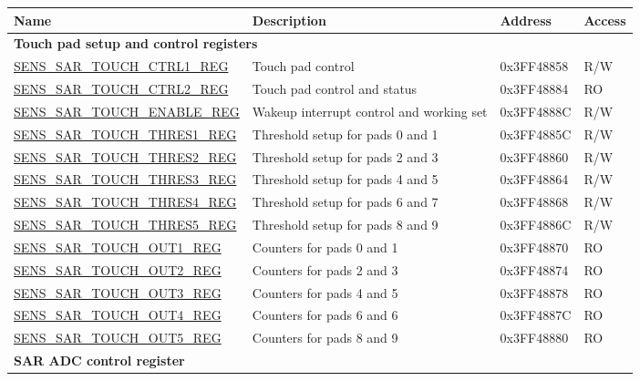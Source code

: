 \begin{longtable}{ | p{5.5cm} | p{7cm} | p{2cm} | p{1cm} | }
\hline\rowcolor{lightgray}
Name & Description &  Address & Access \\ \hline
\multicolumn{4}{|l|}{\textbf{Touch pad setup and control registers}} \\ \hline
\hyperref[regdesc:SENSSARTOUCHCTRL1REG]{SENS\_SAR\_TOUCH\_CTRL1\_REG} & Touch pad control & 0x3FF48858 & R/W \\ \hline
\hyperref[regdesc:SENSSARTOUCHCTRL2REG]{SENS\_SAR\_TOUCH\_CTRL2\_REG} & Touch pad control and status & 0x3FF48884 & RO \\ \hline
\hyperref[regdesc:SENSSARTOUCHENABLEREG]{SENS\_SAR\_TOUCH\_ENABLE\_REG} & Wakeup interrupt control and working set & 0x3FF4888C & R/W \\ \hline
\hyperref[regdesc:SENSSARTOUCHTHRES1REG]{SENS\_SAR\_TOUCH\_THRES1\_REG} & Threshold setup for pads 0 and 1 & 0x3FF4885C & R/W \\ \hline
\hyperref[regdesc:SENSSARTOUCHTHRES2REG]{SENS\_SAR\_TOUCH\_THRES2\_REG} & Threshold setup for pads 2 and 3 & 0x3FF48860 & R/W \\ \hline
\hyperref[regdesc:SENSSARTOUCHTHRES3REG]{SENS\_SAR\_TOUCH\_THRES3\_REG} & Threshold setup for pads 4 and 5 & 0x3FF48864 & R/W \\ \hline
\hyperref[regdesc:SENSSARTOUCHTHRES4REG]{SENS\_SAR\_TOUCH\_THRES4\_REG} & Threshold setup for pads 6 and 7 & 0x3FF48868 & R/W \\ \hline
\hyperref[regdesc:SENSSARTOUCHTHRES5REG]{SENS\_SAR\_TOUCH\_THRES5\_REG} & Threshold setup for pads 8 and 9 & 0x3FF4886C & R/W \\ \hline
\hyperref[regdesc:SENSSARTOUCHOUT1REG]{SENS\_SAR\_TOUCH\_OUT1\_REG} & Counters for pads 0 and 1 & 0x3FF48870 & RO \\ \hline
\hyperref[regdesc:SENSSARTOUCHOUT2REG]{SENS\_SAR\_TOUCH\_OUT2\_REG} & Counters for pads 2 and 3 & 0x3FF48874 & RO \\ \hline
\hyperref[regdesc:SENSSARTOUCHOUT3REG]{SENS\_SAR\_TOUCH\_OUT3\_REG} & Counters for pads 4 and 5 & 0x3FF48878 & RO \\ \hline
\hyperref[regdesc:SENSSARTOUCHOUT4REG]{SENS\_SAR\_TOUCH\_OUT4\_REG} & Counters for pads 6 and 6 & 0x3FF4887C & RO \\ \hline
\hyperref[regdesc:SENSSARTOUCHOUT5REG]{SENS\_SAR\_TOUCH\_OUT5\_REG} & Counters for pads 8 and 9 & 0x3FF48880 & RO \\ \hline
\multicolumn{4}{|l|}{\textbf{SAR ADC control register}} \\ \hline

\end{longtable}
